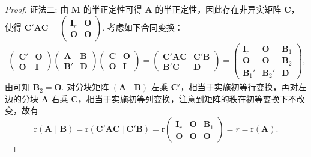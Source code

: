 \documentclass[../../main.tex]{subfiles}%
\begin{document}
\begin{proof}
{\color{blue}证法二:}
由 $\boldsymbol{M}$ 的半正定性可得 $\boldsymbol{A}$ 的半正定性，因此存在非异实矩阵 $\boldsymbol{C}$，使得 $\boldsymbol{C}'\boldsymbol{A}\boldsymbol{C}=\begin{pmatrix}
\boldsymbol{I}_r & \boldsymbol{O} \\
\boldsymbol{O} & \boldsymbol{O}
\end{pmatrix}$. 考虑如下合同变换：
\begin{align*}
\begin{pmatrix}
\boldsymbol{C}' & \boldsymbol{O} \\
\boldsymbol{O} & \boldsymbol{I}
\end{pmatrix}
\begin{pmatrix}
\boldsymbol{A} & \boldsymbol{B} \\
\boldsymbol{B}' & \boldsymbol{D}
\end{pmatrix}
\begin{pmatrix}
\boldsymbol{C} & \boldsymbol{O} \\
\boldsymbol{O} & \boldsymbol{I}
\end{pmatrix}=
\begin{pmatrix}
\boldsymbol{C}'\boldsymbol{A}\boldsymbol{C} & \boldsymbol{C}'\boldsymbol{B} \\
\boldsymbol{B}'\boldsymbol{C} & \boldsymbol{D}
\end{pmatrix}=
\begin{pmatrix}
\boldsymbol{I}_r & \boldsymbol{O} & \boldsymbol{B}_1 \\
\boldsymbol{O} & \boldsymbol{O} & \boldsymbol{B}_2 \\
\boldsymbol{B}_1' & \boldsymbol{B}_2' & \boldsymbol{D}
\end{pmatrix},
\end{align*}
由可知 $\boldsymbol{B}_2 = \boldsymbol{O}$. 对分块矩阵 $\left( \boldsymbol{A}\,\,|\,\,\boldsymbol{B} \right)$ 左乘 $\boldsymbol{C}'$，相当于实施初等行变换，再对左边的分块 $\boldsymbol{A}$ 右乘 $\boldsymbol{C}$，相当于实施初等列变换，注意到矩阵的秩在初等变换下不改变，故有
\[
\mathrm{r}\left( \boldsymbol{A}\,\,|\,\,\boldsymbol{B} \right) =\mathrm{r}\left( \boldsymbol{C}' \boldsymbol{AC}\,\,|\,\boldsymbol{C}' \boldsymbol{B} \right) =\mathrm{r}\begin{pmatrix}
\boldsymbol{I}_r & \boldsymbol{O} & \boldsymbol{B}_1 \\
\boldsymbol{O} & \boldsymbol{O} & \boldsymbol{O}
\end{pmatrix}=r = \mathrm{r}(\boldsymbol{A}).\]

\end{proof}
\end{document}
